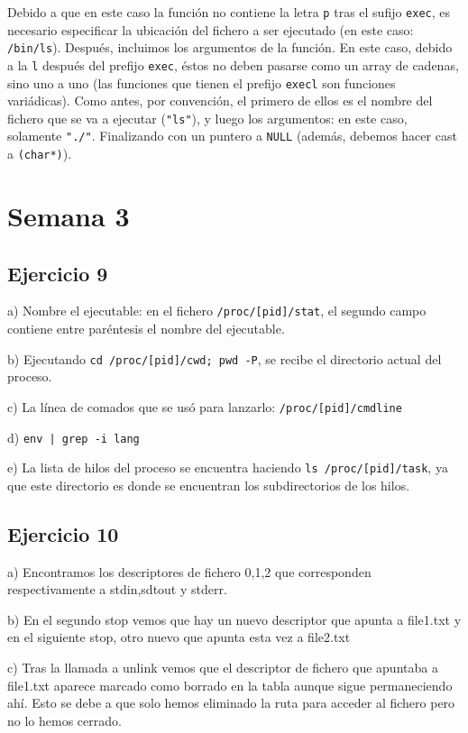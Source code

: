 \documentclass{article}
\begin{document}
Debido a que en este caso la función no contiene la letra \texttt{p} tras el sufijo \texttt{exec}, es necesario especificar la ubicación del fichero a ser ejecutado (en este caso: \texttt{/bin/ls}). Después, incluimos los argumentos de la función. En este caso, debido a la \texttt{l} después del prefijo \texttt{exec}, éstos no deben pasarse como un array de cadenas, sino uno a uno (las funciones que tienen el prefijo \texttt{execl} son funciones variádicas). Como antes, por convención, el primero de ellos es el nombre del fichero que se va a ejecutar (\texttt{"ls"}), y luego los argumentos: en este caso, solamente \texttt{"./"}. Finalizando con un puntero a \texttt{NULL} (además, debemos hacer cast a \texttt{(char*)}).

\section*{Semana 3}

\subsection*{Ejercicio 9}

a) Nombre el ejecutable: en el fichero \texttt{/proc/[pid]/stat}, el segundo campo contiene entre paréntesis el nombre del ejecutable.

b) Ejecutando \texttt{cd /proc/[pid]/cwd; pwd -P}, se recibe el directorio actual del proceso.

c) La línea de comados que se usó para lanzarlo: \texttt{/proc/[pid]/cmdline}

d) \texttt{env | grep -i lang}

e) La lista de hilos del proceso se encuentra haciendo \texttt{ls /proc/[pid]/task}, ya que este directorio es donde se encuentran los subdirectorios de los hilos.

\subsection*{Ejercicio 10}

a) Encontramos los descriptores de fichero 0,1,2 que corresponden respectivamente a stdin,sdtout y stderr.

b) En el segundo stop vemos que hay un nuevo descriptor que apunta a file1.txt y en el siguiente stop, otro nuevo que apunta esta vez a file2.txt

c) Tras la llamada a unlink vemos que el descriptor de fichero que apuntaba a file1.txt aparece marcado como borrado en la tabla aunque sigue permaneciendo ahí. Esto se debe a que solo hemos eliminado la ruta para acceder al fichero pero no lo hemos cerrado.
\end{document}
